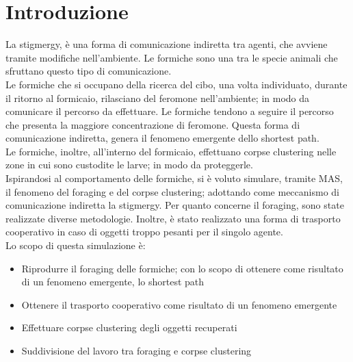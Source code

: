 \documentclass[12pt,a4paper,openright,twoside]{report}
\begin{document}
	\chapter*{Introduzione}                 %

La stigmergy, è una forma di comunicazione indiretta tra agenti, che avviene tramite modifiche nell'ambiente. Le formiche sono una tra le specie animali che sfruttano questo tipo di comunicazione.\\
Le formiche che si occupano della ricerca del cibo, una volta individuato, durante il ritorno al formicaio, rilasciano del feromone nell'ambiente; in modo da comunicare il percorso da effettuare. Le formiche tendono a seguire il percorso che presenta la maggiore concentrazione di feromone. Questa forma di comunicazione indiretta, genera il fenomeno emergente dello shortest path.\\
Le formiche, inoltre, all'interno del formicaio, effettuano corpse clustering nelle zone in cui sono custodite le larve; in modo da proteggerle.\\
Ispirandosi al comportamento delle formiche, si è voluto simulare, tramite MAS, il fenomeno del foraging e del corpse clustering; adottando come meccanismo di comunicazione indiretta la stigmergy. Per quanto concerne il foraging, sono state realizzate diverse metodologie. Inoltre, è stato realizzato una forma di trasporto cooperativo in caso di oggetti troppo pesanti per il singolo agente.\\
Lo scopo di questa simulazione è:

\begin{itemize}
	\item Riprodurre il foraging delle formiche; con lo scopo di ottenere come risultato di un fenomeno emergente, lo shortest path
	\item Ottenere il trasporto cooperativo come risultato di un fenomeno emergente
	\item Effettuare corpse clustering degli oggetti recuperati
	\item Suddivisione del lavoro tra foraging e corpse clustering
\end{itemize}
\end{document}
